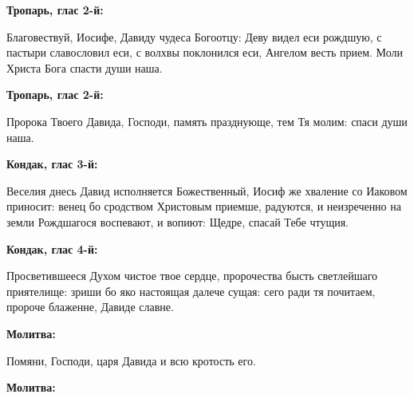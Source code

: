 \bfseries Тропарь, глас 2-й:\normalfont{}


Благовествуй, Иосифе, Давиду чудеса Богоотцу: Деву видел еси рождшую, с пастыри славословил еси, с волхвы поклонился еси, Ангелом весть прием. Моли Христа Бога спасти души наша.


\medskip


\bfseries Тропарь, глас 2-й:\normalfont{}


Пророка Твоего Давида, Господи, память празднующе, тем Тя молим: спаси души наша.


\medskip


\bfseries Кондак, глас 3-й:\normalfont{}


Веселия днесь Давид исполняется Божественный, Иосиф же хваление со Иаковом приносит: венец бо сродством Христовым приемше, радуются, и неизреченно на земли Рождшагося воспевают, и вопиют: Щедре, спасай Тебе чтущия.


\medskip


\bfseries Кондак, глас 4-й:\normalfont{}


Просветившееся Духом чистое твое сердце, пророчества бысть светлейшаго приятелище: зриши бо яко настоящая далече сущая: сего ради тя почитаем, пророче блаженне, Давиде славне.


\medskip


\bfseries Молитва:\normalfont{}


Помяни, Господи, царя Давида и всю кротость его.


\medskip


\bfseries Молитва:\normalfont{}


